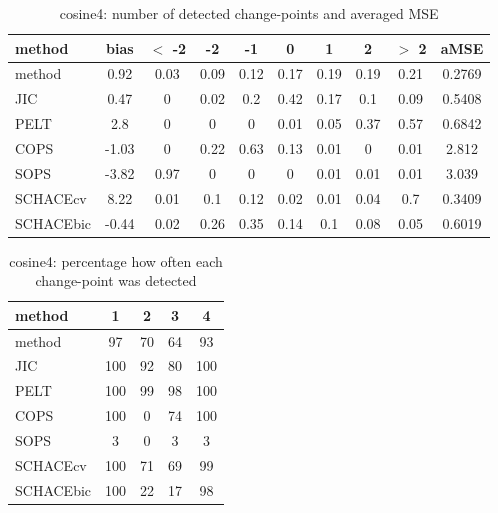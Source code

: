 \begin{table}[ht]
\centering
\begin{tabular}{l|c|ccccccc|c}
  \hline
method & bias & $<$ -2 & -2 & -1 & 0 & 1 & 2 & $>$ 2 & aMSE \\ 
  \hline
method &  0.92 &  0.03 &  0.09 &  0.12 &  0.17 &  0.19 &  0.19 &  0.21 & 0.2769 \\ 
  JIC &  0.47 &     0 &  0.02 &   0.2 &  0.42 &  0.17 &   0.1 &  0.09 & 0.5408 \\ 
  PELT &   2.8 &     0 &     0 &     0 &  0.01 &  0.05 &  0.37 &  0.57 & 0.6842 \\ 
  COPS & -1.03 &     0 &  0.22 &  0.63 &  0.13 &  0.01 &     0 &  0.01 & 2.812 \\ 
  SOPS & -3.82 &  0.97 &     0 &     0 &     0 &  0.01 &  0.01 &  0.01 & 3.039 \\ 
  SCHACEcv &  8.22 &  0.01 &   0.1 &  0.12 &  0.02 &  0.01 &  0.04 &   0.7 & 0.3409 \\ 
  SCHACEbic & -0.44 &  0.02 &  0.26 &  0.35 &  0.14 &   0.1 &  0.08 &  0.05 & 0.6019 \\ 
   \hline
\end{tabular}
\caption{cosine4: number of detected change-points and averaged MSE} 
\label{tab:cosine4Njumps}
\end{table}
\begin{table}[ht]
\centering
\begin{tabular}{l|cccc}
  \hline
method & 1 & 2 & 3 & 4 \\ 
  \hline
method &     97 &     70 &     64 &     93 \\ 
  JIC &    100 &     92 &     80 &    100 \\ 
  PELT &    100 &     99 &     98 &    100 \\ 
  COPS &    100 &      0 &     74 &    100 \\ 
  SOPS &      3 &      0 &      3 &      3 \\ 
  SCHACEcv &    100 &     71 &     69 &     99 \\ 
  SCHACEbic &    100 &     22 &     17 &     98 \\ 
   \hline
\end{tabular}
\caption{cosine4: percentage how often each change-point was detected} 
\label{tab:cosine4Detections}
\end{table}
